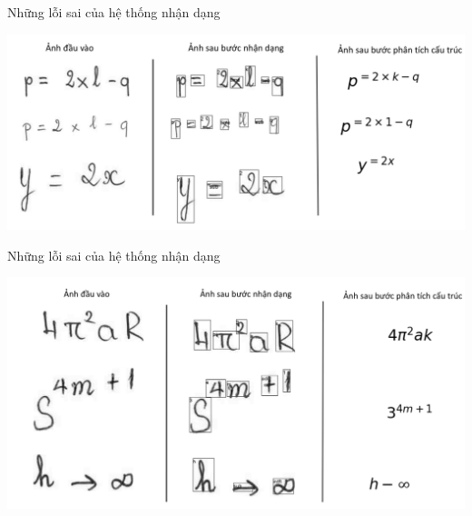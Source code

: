 \documentclass{beamer}
\begin{document}
	\begin{frame}{Những lỗi sai của hệ thống nhận dạng}
		\begin{center}
			\centering
			\includegraphics[width=0.775\linewidth]{phuluc_loi}
			\vspace{0.5cm}
		\end{center}
	\end{frame}
	
	\begin{frame}{Những lỗi sai của hệ thống nhận dạng}
		\begin{center}
			\centering
			\includegraphics[width=0.775\linewidth]{phuluc_sainhan}
			\vspace{0.5cm}
		\end{center}
	\end{frame}
	
\end{document}
